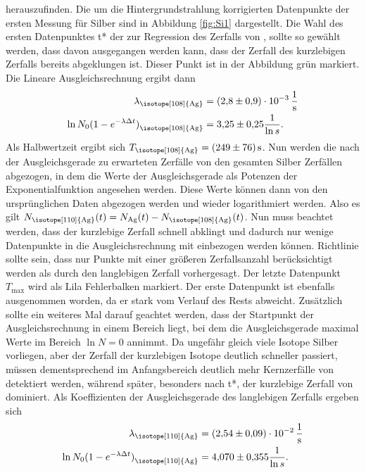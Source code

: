 herauszufinden. Die um die Hintergrundstrahlung korrigierten Datenpunkte der 
ersten Messung für Silber sind in Abbildung \ref{fig:Si1} dargestellt. Die Wahl des ersten Datenpunktes t* der zur Regression des Zerfalls von , sollte
so gewählt werden, dass davon ausgegangen werden kann, dass der Zerfall des kurzlebigen Zerfalls bereits abgeklungen ist. Dieser Punkt ist in der Abbildung grün markiert.
Die Lineare Ausgleichsrechnung ergibt dann
\begin{align*}
  \lambda_\text{\isotope[108]{Ag}}&=\qty{2.8(0.9)e-3}{\per\s}\\
  \ln{N_0(1-e^{-\lambda \Delta t})}_\text{\isotope[108]{Ag}}&=\num{3.25(0.25)}\frac{1}{\ln{s}}.
\end{align*}
Als Halbwertzeit ergibt sich $T_\text{\isotope[108]{Ag}}=\qty{249(76)}{\second}$.
Nun werden die nach der Ausgleichsgerade zu erwarteten Zerfälle von den gesamten Silber Zerfällen abgezogen, in dem 
die Werte der Ausgleichsgerade als Potenzen der Exponentialfunktion angesehen werden. Diese Werte können dann von den ursprünglichen
Daten abgezogen werden und wieder logarithmiert werden.
Also es gilt $N_\text{\isotope[110]{Ag}}(t)=N_\text{Ag}(t)-N_\text{\isotope[108]{Ag}}(t)$.
Nun muss beachtet werden, dass der kurzlebige Zerfall schnell abklingt und dadurch nur wenige Datenpunkte 
in die Ausgleichsrechnung mit einbezogen werden können. Richtlinie sollte sein, dass nur Punkte mit einer größeren 
Zerfallsanzahl berücksichtigt werden als durch den langlebigen Zerfall vorhergesagt.
Der letzte Datenpunkt $T_\text{max}$ wird als Lila Fehlerbalken markiert. Der erste Datenpunkt ist ebenfalls ausgenommen worden, da er stark vom Verlauf des Rests abweicht.
Zusätzlich sollte ein weiteres Mal darauf geachtet werden, dass der Startpunkt der Ausgleichsrechnung in einem Bereich liegt, bei dem 
die Ausgleichsgerade maximal Werte im Bereich $\ln{N}=0$ annimmt. Da ungefähr gleich viele Isotope Silber vorliegen, aber
der Zerfall der kurzlebigen Isotope deutlich schneller passiert, müssen dementsprechend im Anfangsbereich deutlich mehr Kernzerfälle
von  detektiert werden, während später, besonders nach t*, der kurzlebige Zerfall von 
dominiert.
Als Koeffizienten der Ausgleichsgerade des langlebigen Zerfalls ergeben sich
\begin{align*}
  \lambda_\text{\isotope[110]{Ag}}&=\qty{2.54(0.9)e-2}{\per\s}\\
  \ln{N_0(1-e^{-\lambda \Delta t})}_\text{\isotope[110]{Ag}}&=\num{4.07(0.355)}\frac{1}{\ln{s}}.
\end{align*}
